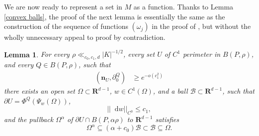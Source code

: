 \documentclass[reqno,11pt]{amsart}
\newcommand{\RR}{\mathbf{R}}
\newcommand*\dif{\mathop{}\!\mathrm{d}}
\newcommand{\normal}{\mathbf n}
\newtheorem{lemma}[theorem]{Lemma}
\theoremstyle{definition}
\numberwithin{equation}{section}
\begin{document}
We are now ready to represent a set in $M$ as a function.
Thanks to Lemma \ref{convex balls}, the proof of the next lemma is essentially the same as the construction of the sequence of functions $(\omega_j)$ in the proof of \cite[Lemma 6.4]{Giusti77}, but without the wholly unnecessary appeal to proof by contradiction.

\begin{lemma}\label{rep as a good graph}
For every $\rho \ll_{c_0, c_1, d} |K|^{-1/2}$, every set $U$ of $C^1$ perimeter in $B(P, \rho)$, and every $Q \in B(P, \rho)$, such that
\begin{align}
(\normal_U, \partial_0^Q) &\geq e^{-o(c_1^2)} \label{rep as a good graph hyp}
\end{align}
there exists an open set $\Omega \subset \RR^{d - 1}$, $w \in C^1(\Omega)$, and a ball $\mathscr B \subset \RR^{d - 1}$, such that $\partial U = \Phi^Q(\Psi_w(\Omega))$,
\begin{equation}\label{rep as a good graph small derivative}
||\dif w||_{C^0} \leq c_1,
\end{equation}
and the pullback $\Omega^\alpha$ of $\partial U \cap B(P, \alpha \rho)$ to $\RR^{d - 1}$ satisfies
\begin{equation}\label{rep as a good graph set nests}
    \Omega^\alpha \subseteq (\alpha + c_0) \mathscr B \subset \mathscr B \subseteq \Omega.
\end{equation}
\end{lemma}
\end{document}
